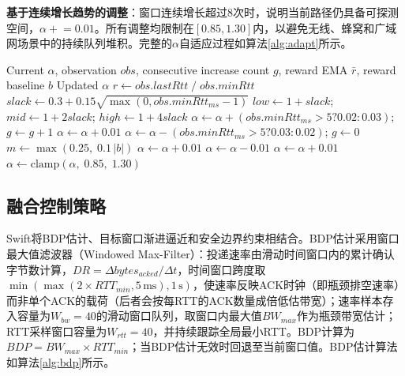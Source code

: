 \documentclass[10pt,twocolumn]{article}
\begin{document}
\textbf{基于连续增长趋势的调整}：窗口连续增长超过8次时，说明当前路径仍具备可探测空间，$\alpha \mathrel{+}=0.01$。所有调整均限制在$[0.85,1.30]$内，以避免无线、蜂窝和广域网场景中的持续队列堆积。完整的$\alpha$自适应过程如算法\ref{alg:adapt}所示。

\begin{algorithm}[htbp]
\caption{RTT- and Reward-Aware Adaptive Parameter Tuning}
\label{alg:adapt}
\small
\begin{algorithmic}[1]
\REQUIRE Current $\alpha$, observation $obs$, consecutive increase count $g$, reward EMA $\bar{r}$, reward baseline $b$
\ENSURE Updated $\alpha$
\STATE $r \leftarrow obs.lastRtt \;/\; obs.minRtt$
\STATE $slack \leftarrow 0.3 + 0.15\sqrt{\max(0, obs.minRtt_{ms}-1)}$
\STATE $low \leftarrow 1+slack$; $mid \leftarrow 1+2slack$; $high \leftarrow 1+4slack$
    \STATE $\alpha \leftarrow \alpha + (obs.minRtt_{ms}>5 ? 0.02 : 0.03)$; $g \leftarrow g+1$
    \STATE $\alpha \leftarrow \alpha + 0.01$
    \STATE $\alpha \leftarrow \alpha - (obs.minRtt_{ms}>5 ? 0.03 : 0.02)$; $g \leftarrow 0$
\ENDIF
\STATE $m \leftarrow \max(0.25, \; 0.1\,|b|)$
    \STATE $\alpha \leftarrow \alpha + 0.01$
    \STATE $\alpha \leftarrow \alpha - 0.01$
\ENDIF
{}
    \STATE $\alpha \leftarrow \alpha + 0.01$
\ENDIF
\STATE $\alpha \leftarrow \text{clamp}(\alpha, \; 0.85, \; 1.30)$
\end{algorithmic}
\end{algorithm}

\subsection{融合控制策略}

Swift将BDP估计、目标窗口渐进逼近和安全边界约束相结合。BDP估计采用窗口最大值滤波器（Windowed Max-Filter）：投递速率由滑动时间窗口内的累计确认字节数计算，$DR = \Delta bytes_{acked} / \Delta t$，时间窗口跨度取$\min(\max(2 \times RTT_{min}, 5\,\text{ms}), 1\,\text{s})$，使速率反映ACK时钟（即瓶颈排空速率）而非单个ACK的载荷（后者会按每RTT的ACK数量成倍低估带宽）；速率样本存入容量为$W_{bw}=40$的滑动窗口队列，取窗口内最大值$BW_{max}$作为瓶颈带宽估计；RTT采样窗口容量为$W_{rtt}=40$，并持续跟踪全局最小RTT。BDP计算为$BDP = BW_{max} \times RTT_{min}$；当BDP估计无效时回退至当前窗口值。BDP估计算法如算法\ref{alg:bdp}所示。
\end{document}

